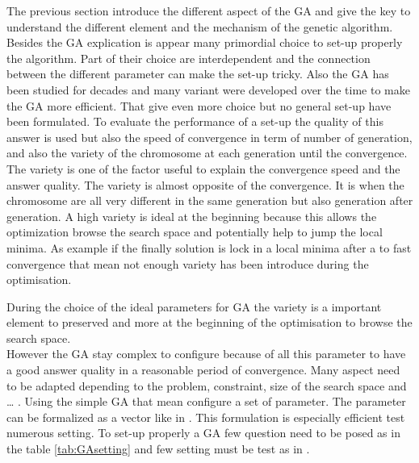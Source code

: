The previous section introduce the different aspect of the GA and give the key to understand the different element and the mechanism of the genetic algorithm. Besides the GA explication is appear many primordial  choice  to set-up properly the algorithm. Part of their choice are interdependent and the connection between the different parameter can make the set-up tricky.
Also the GA has been studied for decades and many variant were developed over the time to make the GA more efficient. That give even more choice but no general set-up have been formulated.
To evaluate the  performance of a set-up the quality of this answer is used but also the speed of convergence in term of number of generation, and also the variety of the chromosome at each generation until the convergence. 
The variety is one of the factor useful to explain the convergence speed and the answer quality.
The variety is almost opposite of the convergence. It is when the chromosome  are all very different in the same generation but also generation after generation. A high variety is ideal at the beginning because this allows the optimization browse the search space and potentially help to jump the local minima. 
 As example if the finally solution is lock in a local minima after a to fast convergence that mean not enough variety has been introduce during the optimisation.

During the choice of the ideal parameters for GA the variety is a important element to preserved and more at the beginning of the optimisation to browse the search space.\\
 
However the GA stay complex to configure because of all this parameter to have a good answer quality in a reasonable period of convergence. Many aspect need to be adapted depending to the problem, constraint, size of the search space and … .   
Using the simple GA that mean configure a set of parameter. The parameter can be formalized as a vector like in \cite{71*grefenstette1986}. This formulation is especially  efficient test numerous setting. 
To set-up properly a GA few question need to be posed as in the table \ref{tab:GAsetting} and few setting must be test as in \cite{73*wright1991,71*grefenstette1986,133*schwefel1984}.

